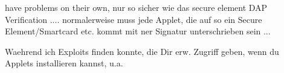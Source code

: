 have problems on their own, nur so sicher wie das secure element
DAP Verification .... normalerweise muss jede Applet, die auf so ein Secure Element/Smartcard etc. kommt mit ner Signatur unterschrieben sein ...


Waehrend ich Exploits finden konnte, die Dir erw. Zugriff geben, wenn du Applets installieren kannst, u.a.
